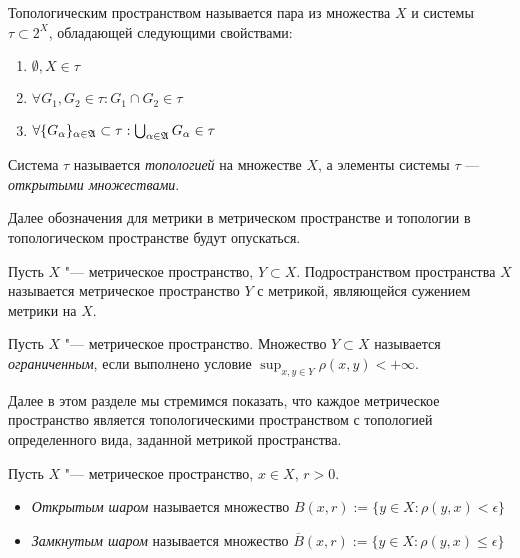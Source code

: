 \begin{definition}
	Топологическим пространством называется пара из множества $X$ и системы $\tau \subset 2^X$, обладающей следующими свойствами:
	\begin{enumerate}
		\item $\emptyset, X \in \tau$
		\item $\forall G_1, G_2 \in \tau: G_1 \cap G_2 \in \tau$
		\item $\forall \{G_\alpha\}_{\alpha \in \mathfrak A} \subset \tau: \bigcup_{\alpha \in \mathfrak A}G_\alpha\in \tau$
	\end{enumerate}
	
	Система $\tau$ называется \textit{топологией} на множестве $X$, а элементы системы $\tau$ --- \textit{открытыми множествами}.
\end{definition}

\begin{note}
	Далее обозначения для метрики в метрическом пространстве и топологии в топологическом пространстве будут опускаться.
\end{note}

\begin{definition}
	Пусть $X$ "--- метрическое пространство, $Y \subset X$. Подространством пространства $X$ называется метрическое пространство $Y$ с метрикой, являющейся сужением метрики на $X$.
\end{definition}

\begin{definition}
	Пусть $X$ "--- метрическое пространство. Множество $Y \subset X$ называется \textit{ограниченным}, если выполнено условие $\sup_{x, y \in Y} \rho(x, y) < +\infty$.
\end{definition}

\begin{note}
	Далее в этом разделе мы стремимся показать, что каждое метрическое пространство является топологическими пространством с топологией определенного вида, заданной метрикой пространства.
\end{note}

\begin{definition}
	Пусть $X$ "--- метрическое пространство, $x \in X$, $r > 0$.
	\begin{itemize}
		\item \textit{Открытым шаром} называется множество $B(x, r) := \{y \in X: \rho(y, x) < \epsilon\}$
		
		\item \textit{Замкнутым шаром} называется множество $\overline B(x, r) := \{y \in X: \rho(y, x) \le \epsilon\}$
	\end{itemize}
\end{definition}

